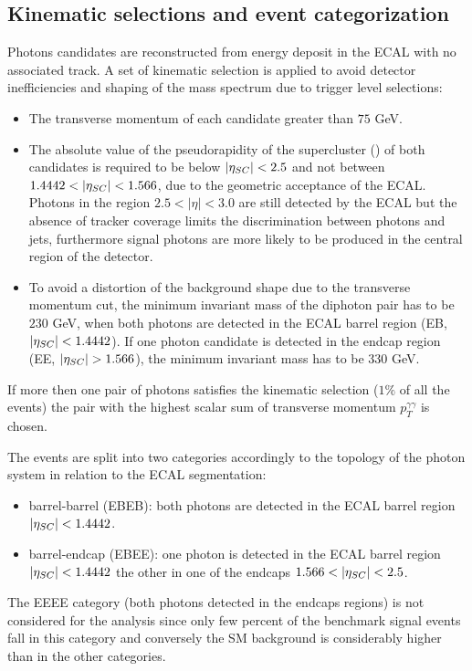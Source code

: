 \subsection{Kinematic selections and event categorization}
\label{subsec:event_cats}
Photons candidates are reconstructed from energy deposit in the ECAL with no associated track.
A set of kinematic selection is applied to avoid detector inefficiencies and shaping of the mass
spectrum due to trigger level selections:
\begin{itemize}
\item The transverse momentum of each candidate greater than $75$ GeV.
\item The absolute value of the pseudorapidity of the supercluster (\absScEta) of both
candidates is required to be below $|\eta_{SC}| < 2.5$ and not between $1.4442 < |\eta_{SC}| < 1.566$,
due to the geometric acceptance of the ECAL. Photons in the region $2.5 < |\eta| < 3.0$ are still detected by the ECAL
but the absence of tracker coverage limits the discrimination between photons and jets, furthermore signal photons
are more likely to be produced in the central region of the detector.
\item To avoid a distortion of the background shape due to the transverse momentum
  cut, the minimum invariant mass of the diphoton pair has to be $230$ GeV, when
both photons are detected in the ECAL barrel region (EB, $|\eta_{SC}| < 1.4442$). If one photon candidate
is detected in the endcap region (EE, $|\eta_{SC}| > 1.566$), the minimum invariant mass
has to be $330$ GeV.
\end{itemize}

If more then one pair of photons satisfies the kinematic selection ($1\%$ of all the events) the pair
with the highest scalar sum of transverse momentum $p_T^{\gamma\gamma}$ is chosen.

The events are split into two categories accordingly to the topology of the photon system in relation
to the ECAL segmentation:
\begin{itemize}
\item barrel-barrel (EBEB): both photons are detected in the ECAL barrel region $|\eta_{SC}| < 1.4442$.
\item barrel-endcap (EBEE): one photon is detected in the ECAL barrel region $|\eta_{SC}| < 1.4442$ the other
  in one of the endcaps $1.566 < |\eta_{SC}| < 2.5$.
\end{itemize}

The EEEE category (both photons detected in the endcaps regions) is not considered for the analysis
since only few percent of the benchmark signal events fall in this category and conversely the SM
background is considerably higher than in the other categories.

